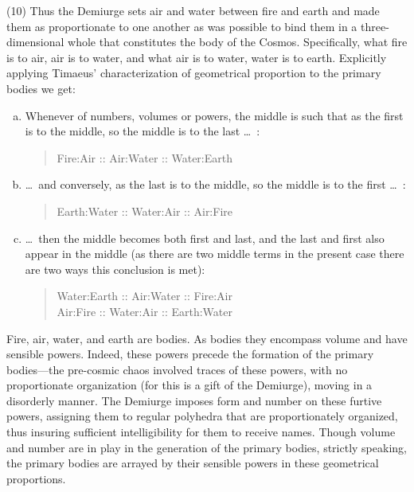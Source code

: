 (10) Thus the Demiurge sets air and water between fire and earth and made them as proportionate to one another as was possible to bind them in a three-dimensional whole that constitutes the body of the Cosmos. Specifically, what fire is to air, air is to water, and what air is to water, water is to earth. Explicitly applying Timaeus' characterization of geometrical proportion to the primary bodies we get:
\begin{enumerate}[(a)]
	\item Whenever of numbers, volumes or powers, the middle is such that as the first is to the middle, so the middle is to the last \ldots\ :
	\begin{quote}
		Fire:Air :: Air:Water :: Water:Earth
	\end{quote}
	\item \ldots\ and conversely, as the last is to the middle, so the middle is to the first \dots\ :
	\begin{quote}
		Earth:Water :: Water:Air :: Air:Fire
	\end{quote}
	\item \ldots\ then the middle becomes both first and last, and the last and first also appear in the middle (as there are two middle terms in the present case there are two ways this conclusion is met):
	\begin{quote}
		Water:Earth :: Air:Water :: Fire:Air\\
		Air:Fire :: Water:Air :: Earth:Water
	\end{quote}
\end{enumerate}
Fire, air, water, and earth are bodies. As bodies they encompass volume and have sensible powers. Indeed, these powers precede the formation of the primary bodies---the pre-cosmic chaos involved traces of these powers, with no proportionate organization (for this is a gift of the Demiurge), moving in a disorderly manner. The Demiurge imposes form and number on these furtive powers, assigning them to regular polyhedra that are proportionately organized, thus insuring sufficient intelligibility for them to receive names. Though volume and number are in play in the generation of the primary bodies, strictly speaking, the primary bodies are arrayed by their sensible powers in these geometrical proportions. 

